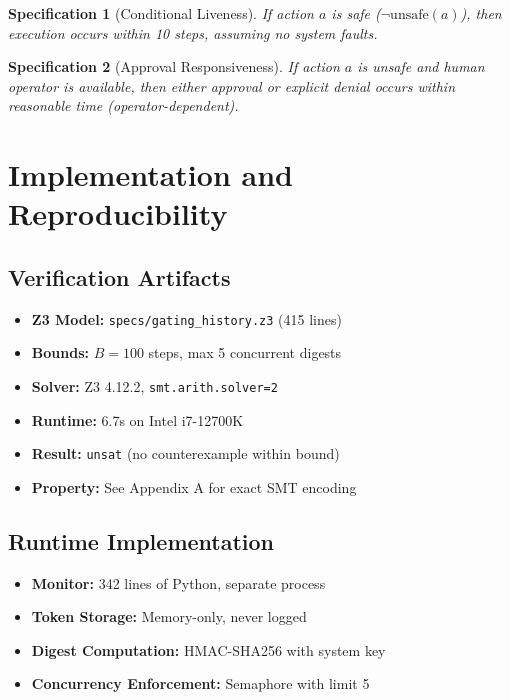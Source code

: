\documentclass[12pt]{article}
\newtheorem{spec}{Specification}[section]
\begin{document}
\begin{spec}[Conditional Liveness]
If action $a$ is safe ($\neg\text{unsafe}(a)$), then execution occurs within 10 steps, assuming no system faults.
\end{spec}

\begin{spec}[Approval Responsiveness]
If action $a$ is unsafe and human operator is available, then either approval or explicit denial occurs within reasonable time (operator-dependent).
\end{spec}

\section{Implementation and Reproducibility}

\subsection{Verification Artifacts}

\begin{itemize}
    \item \textbf{Z3 Model:} \texttt{specs/gating\_history.z3} (415 lines)
    \item \textbf{Bounds:} $B=100$ steps, max 5 concurrent digests
    \item \textbf{Solver:} Z3 4.12.2, \texttt{smt.arith.solver=2}
    \item \textbf{Runtime:} 6.7s on Intel i7-12700K
    \item \textbf{Result:} \texttt{unsat} (no counterexample within bound)
    \item \textbf{Property:} See Appendix A for exact SMT encoding
\end{itemize}

\subsection{Runtime Implementation}

\begin{itemize}
    \item \textbf{Monitor:} 342 lines of Python, separate process
    \item \textbf{Token Storage:} Memory-only, never logged
    \item \textbf{Digest Computation:} HMAC-SHA256 with system key
    \item \textbf{Concurrency Enforcement:} Semaphore with limit 5
\end{itemize}
\end{document}
